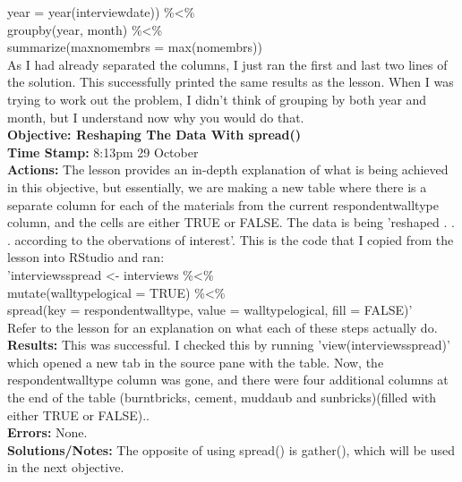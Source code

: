 \documentclass{article}
\begin{document}
\begin{FlushLeft}
year = year(interview\textunderscore date)) \%\textless\%\\
group\textunderscore by(year, month) \%\textless\%\\
summarize(max\textunderscore no\textunderscore membrs = max(no\textunderscore membrs))\\
As I had already separated the columns, I just ran the first and last two lines of the solution. This successfully printed the same results as the lesson. When I was trying to work out the problem, I didn't think of grouping by both year and month, but I understand now why you would do that.\\
\vspace{5mm}
\textbf{Objective: Reshaping The Data With spread()}\\ 
\textbf{Time Stamp:} 8:13pm 29 October\\
\textbf{Actions:} The lesson provides an in-depth explanation of what is being achieved in this objective, but essentially, we are making a new table where there is a separate column for each of the materials from the current respondent\textunderscore wall\textunderscore type column, and the cells are either TRUE or FALSE. The data is being 'reshaped . . . according to the obervations of interest'. This is the code that I copied from the lesson into RStudio and ran:\\
'interviews\textunderscore spread \textless - interviews \%\textless\%\\
mutate(wall\textunderscore type\textunderscore logical = TRUE) \%\textless\%\\
spread(key = respondent\textunderscore wall\textunderscore type, value = wall\textunderscore type\textunderscore logical, fill = FALSE)'\\
Refer to the lesson for an explanation on what each of these steps actually do.\\
\textbf{Results:} This was successful. I checked this by running 'view(interviews\textunderscore spread)' which opened a new tab in the source pane with the table. Now, the respondent\textunderscore wall\textunderscore type column was gone, and there were four additional columns at the end of the table (burntbricks, cement, muddaub and sunbricks)(filled with either TRUE or FALSE)..\\
\textbf{Errors:} None.\\
\textbf{Solutions/Notes:} The opposite of using spread() is gather(), which will be used in the next objective.\\
\vspace{5mm}

\end{FlushLeft}
\end{document}
